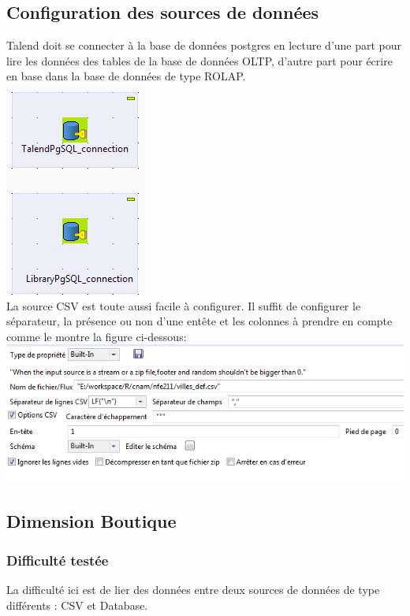\subsection{Configuration des sources de données}
Talend doit se connecter à la base de données postgres en lecture d'une part pour lire les données des tables de la base de données OLTP, d'autre part pour écrire en base dans la base de données de type ROLAP.\\
\includegraphics[scale=1]{images/db_connection.PNG}\\
La source CSV est toute aussi facile à configurer. Il suffit de configurer le séparateur, la présence ou non d'une entête et les colonnes à prendre en compte comme le montre la figure ci-dessous:\\

\includegraphics[scale=0.60]{images/csv.PNG}

\subsection{Dimension Boutique}
\subsubsection{Difficulté testée}
La difficulté ici est de lier des données entre deux sources de données de type différents : CSV et Database.

